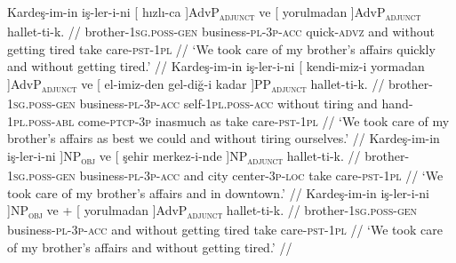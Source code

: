\pex[exno=TS6,glspace=!1em,everygla={},everyglb={},aboveglbskip=-.15ex, interpartskip=15pt]
\label{TS6} 
\a
\begingl
\gla Kardeş-im-in iş-ler-i-ni {[} {hızlı-ca }]AdvP\textsubscript{\textsc{adjunct}} ve {[} {yorulmadan }]AdvP\textsubscript{\textsc{adjunct}} hallet-ti-k. //
\glb brother-\textsc{1sg.poss}-\textsc{gen} business-\textsc{pl}-\textsc{3p}-\textsc{acc} quick-\textsc{advz} and {without getting tired} {take care}-\textsc{pst}-\textsc{1pl}  //
\glft `We took care of my brother's affairs quickly and without getting tired.' //
\endgl
\a
\begingl
\gla Kardeş-im-in iş-ler-i-ni {[} kendi-miz-i {yormadan }]AdvP\textsubscript{\textsc{adjunct}} ve {[} el-imiz-den gel-diğ-i {kadar }]PP\textsubscript{\textsc{adjunct}} hallet-ti-k. //
\glb brother-\textsc{1sg.poss}-\textsc{gen} business-\textsc{pl}-\textsc{3p}-\textsc{acc} self-\textsc{1pl.poss}-\textsc{acc} {without tiring} and hand-\textsc{1pl.poss}-\textsc{abl} come-\textsc{ptcp}-\textsc{3p} {inasmuch as}  {take care}-\textsc{pst}-\textsc{1pl} //
\glft `We took care of my brother's affairs as best we could and without tiring ourselves.' //
\endgl
\a
\begingl
\gla {[} Kardeş-im-in {iş-ler-i-ni }]NP\textsubscript{\textsc{obj}} ve {[} şehir {merkez-i-nde }]NP\textsubscript{\textsc{adjunct}} hallet-ti-k. //
\glb brother-\textsc{1sg.poss}-\textsc{gen} business-\textsc{pl}-\textsc{3p}-\textsc{acc} and city center-\textsc{3p}-\textsc{loc} {take care}-\textsc{pst}-\textsc{1pl} //
\glft `We took care of my brother's affairs and in downtown.' //
\endgl
\a
\begingl
\gla {[} Kardeş-im-in {iş-ler-i-ni }]NP\textsubscript{\textsc{obj}} ve + {[} {yorulmadan }]AdvP\textsubscript{\textsc{adjunct}} hallet-ti-k. //
\glb brother-\textsc{1sg.poss}-\textsc{gen} business-\textsc{pl}-\textsc{3p}-\textsc{acc} and {without getting tired} {take care}-\textsc{pst}-\textsc{1pl} //
\glft `We took care of my brother's affairs and without getting tired.' //
\endgl
\xe

